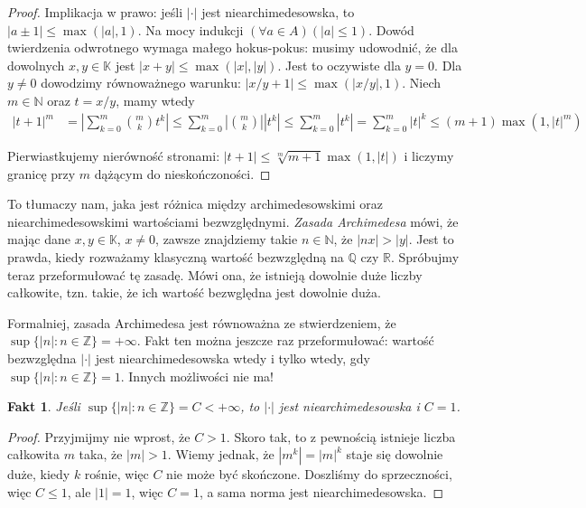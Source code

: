 \documentclass[a4paper,fleqn,9pt]{extarticle}
\newtheorem{fkt}{Fakt}
\begin{document}
\begin{proof}Implikacja w prawo: jeśli $|\cdot|$ jest niearchimedesowska, to $|a\pm 1| \le \max(|a|, 1)$. Na mocy indukcji $(\forall a \in A)(|a| \le 1).$ Dowód twierdzenia odwrotnego wymaga małego hokus-pokus: musimy udowodnić, że dla dowolnych $x,y\in\mathbb K$ jest $|x+y|\le \max(|x|,|y|)$. Jest to oczywiste dla $y=0$. Dla $y\neq 0$ dowodzimy równoważnego warunku: $|x/y+1| \le \max (|x/y|,1)$. Niech $m\in \mathbb N$ oraz $t = x/y$, mamy wtedy
\begin{align*}|t+1|^m & = \left| \sum_{k=0}^m {m \choose k} t^k\right| \le \sum_{k=0}^m \left|{m \choose k}\right|\left| t^k\right| \le \sum_{k=0}^m \left| t^k\right| = \sum_{k=0}^m \left| t\right|^k \le (m+1) \max(1, |t|^m)\end{align*}

Pierwiastkujemy nierówność stronami: $|t+1| \le \sqrt[m]{m+1} \max(1,|t|)$ i liczymy granicę przy $m$ dążącym do nieskończoności.
\end{proof}

To tłumaczy nam, jaka jest różnica między archimedesowskimi oraz niearchimedesowskimi wartościami bezwzględnymi. \emph{Zasada Archimedesa} mówi, że mając dane $x,y\in \mathbb K$, $x\neq 0$, zawsze znajdziemy takie $n\in\mathbb N$, że $|nx| > |y|$. Jest to prawda, kiedy rozważamy klasyczną wartość bezwzględną na $\mathbb Q$ czy $\mathbb R$. Spróbujmy teraz przeformułować tę zasadę. Mówi ona, że istnieją dowolnie duże liczby całkowite, tzn. takie, że ich wartość bezwględna jest dowolnie duża.

Formalniej, zasada Archimedesa jest równoważna ze stwierdzeniem, że $\sup\{|n|:n\in\mathbb Z\} = +\infty$. Fakt ten można jeszcze raz przeformułować: wartość bezwzględna $|\cdot|$ jest niearchimedesowska wtedy i tylko wtedy, gdy $\sup\{|n|:n\in\mathbb Z\} = 1$. Innych możliwości nie ma!

\begin{fkt}Jeśli $\sup\{|n|:n\in\mathbb Z\} = C < +\infty$, to $|\cdot|$ jest niearchimedesowska i $C = 1$.\end{fkt}

\begin{proof}Przyjmijmy nie wprost, że $C > 1$. Skoro tak, to z pewnością istnieje liczba całkowita $m$ taka, że $|m| > 1$. Wiemy jednak, że $|m^k| = |m|^k$ staje się dowolnie duże, kiedy $k$ rośnie, więc $C$ nie może być skończone. Doszliśmy do sprzeczności, więc $C \le 1$, ale $|1| = 1$, więc $C=1$, a sama norma jest niearchimedesowska.\end{proof}
\end{document}
